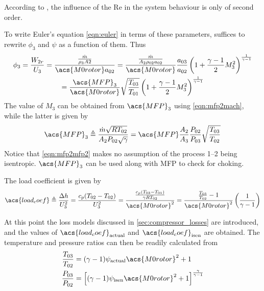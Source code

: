 \documentclass[tcc]{subfiles}
\begin{document}
According to \textcite{walsh2004gas},
 the influence of the \acl{Re} in the system behaviour is only of second order.

To write Euler's equation \cref{eqn:euler} in terms of these parameters, suffices to rewrite $\phi_3$ and $\psi$ as a function of them. Thus
\begin{multline}
    \label{eqn:phi2_dimensionless}
    \phi_3 = \frac{W_{2r}}{U_3} 
           = \frac{\frac{\dot{m}}{\rho_3 A2}}{\acs{M0rotor} a_{02}}
           = \frac{\MFPalt{2}}{\acs{M0rotor}} \frac{a_{03}}{a_{02}} \stagdensratio{3} \\ 
           = \frac{\acs{MFP}_3}{\acs{M0rotor}} \sqrt{\frac{T_{03}}{T_{01}}} \stagdensratio{3}
\end{multline}
The value of $M_3$ can be obtained from $\acs{MFP}_3$ using \cref{eqn:mfp2mach}, while the latter is given by
\begin{equation}
    \label{eqn:mfp2mfp2}
    \acs{MFP}_3 \triangleq \MFP{2} = \acs{MFP} \frac{A_2}{A_3} \frac{P_{02}}{P_{03}} \sqrt{\frac{T_{03}}{T_{02}}}
\end{equation}
Notice that \cref{eqn:mfp2mfp2} makes no assumption of the process 1--2 being isentropic. $\acs{MFP}_3$ can be used along with \acs{MFP} to check for choking.

The load coefficient is given by
\begin{equation}
    \acs{load_coef}\triangleq \frac{\Delta h}{U_3^2}
                      = \frac{c_p(T_{02}-T_{02})}{U_3^2}
                      = \frac{\frac{c_p(T_{03}-T_{01})}{\gamma R T_{02}}}
                                    {\acs{M0rotor}^2}
                      = \frac{\frac{T_{03}}{T_{02}}-1}
                                  {\acs{M0rotor}^2}
                        \left(\frac{1}{\gamma-1}\right)
\end{equation}

At this point the loss models discussed in \cref{sec:compressor_losses} are introduced, 
and the values of $\acs{load_coef}_{\text{actual}}$ and $\acs{load_coef}_{\text{isen}}$ are obtained.
The temperature and pressure ratios can then be readily calculated from
\begin{align}
    \label{eqn:psi2Tratio}
    \frac{T_{03}}{T_{02}} &= (\gamma - 1)\psi_{\text{actual}} \acs{M0rotor}^2 + 1 \\
    \label{eqn:psi2Pratio}
    \frac{P_{03}}{P_{02}} &= \left[(\gamma - 1)\psi_{\text{isen}} \acs{M0rotor}^2 + 1\right]^\frac{\gamma}{\gamma-1}
\end{align}
\end{document}
